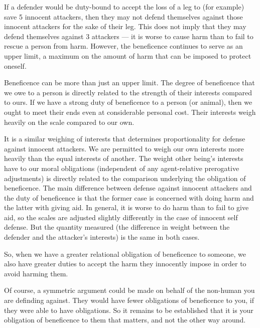 		If a defender would be duty-bound to accept the loss of a leg to (for
		example) save 5 innocent attackers, then they may not defend themselves
		against those innocent attackers for the sake of their leg. This does
		not imply that they may defend themselves against 3 attackers --- it is
		worse to cause harm than to fail to rescue a person from harm. However,
		the beneficence continues to serve as an upper limit, a maximum on the
		amount of harm that can be imposed to protect oneself.

		Beneficence can be more than just an upper limit. The degree of
		beneficence that we owe to a person is directly related to the strength
		of their interests compared to ours. If we have a strong duty of
		beneficence to a person (or animal), then we ought to meet their ends
		even at considerable personal cost. Their interests weigh heavily on
		the scale compared to our own. 

		It is a similar weighing of interests that determines proportionality
		for defense against innocent attackers. We are permitted to weigh our
		own interests more heavily than the equal interests of another. The
		weight other being’s interests have to our moral obligations
		(independent of any agent-relative prerogative adjustments) is directly
		related to the comparison underlying the obligation of beneficence. The
		main difference between defense against innocent attackers and the duty
		of beneficence is that the former case is concerned with doing harm and
		the latter with giving aid. In general, it is worse to do harm than to
		fail to give aid, so the scales are adjusted slightly differently in
		the case of innocent self defense. But the quantity measured (the
		difference in weight between the defender and the attacker’s interests)
		is the same in both cases.

		So, when we have a greater relational obligation of beneficence to
		someone, we also have greater duties to accept the harm they innocently
		impose in order to avoid harming them.

		Of course, a symmetric argument could be made on behalf of the
		non-human you are definding against. They would have fewer obligations
		of beneficence to you, if they were able to have obligations. So it
		remains to be established that it is your obligation of beneficence to
		them that matters, and not the other way around.


